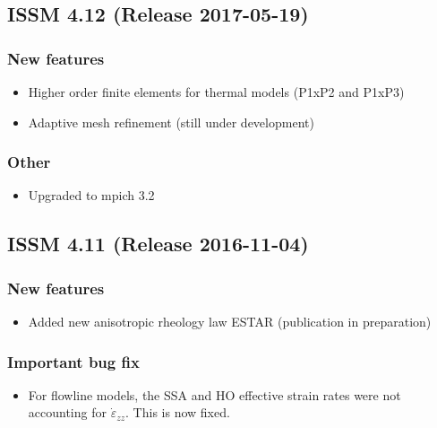 \subsection*{ISSM 4.12 (Release 2017-05-19)}
\subsubsection{New features}
\begin{itemize}
\item Higher order finite elements for thermal models (P1xP2 and P1xP3)
\item Adaptive mesh refinement (still under development)
\end{itemize}
\subsubsection{Other}
\begin{itemize}
\item Upgraded to mpich 3.2
\end{itemize}

\subsection*{ISSM 4.11 (Release 2016-11-04)}
\subsubsection{New features}
\begin{itemize}
\item Added new anisotropic rheology law ESTAR (publication in preparation)
\end{itemize}
\subsubsection{Important bug fix}
\begin{itemize}
\item For flowline models, the SSA and HO effective strain rates were not accounting for $\dot{\varepsilon}_{zz}$. This is now fixed.
\end{itemize}
